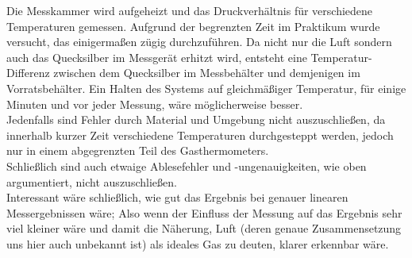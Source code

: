 \documentclass[12pt,a4paper]{article}
\begin{document}
\begin{multicols}{2}
Die Messkammer wird aufgeheizt und das Druckverhältnis für verschiedene Temperaturen gemessen. Aufgrund der begrenzten Zeit im Praktikum wurde versucht, das einigermaßen zügig durchzuführen. Da nicht nur die Luft sondern auch das Quecksilber im Messgerät erhitzt wird, entsteht eine Temperatur-Differenz zwischen dem Quecksilber im Messbehälter und demjenigen im Vorratsbehälter. Ein Halten des Systems auf gleichmäßiger Temperatur, für einige Minuten und vor jeder Messung, wäre möglicherweise besser.\\
Jedenfalls sind Fehler durch Material und Umgebung nicht auszuschließen, da innerhalb kurzer Zeit verschiedene Temperaturen durchgesteppt werden, jedoch nur in einem abgegrenzten Teil des Gasthermometers.\\
Schließlich sind auch etwaige Ablesefehler und -ungenauigkeiten, wie oben argumentiert, nicht auszuschließen.\\
Interessant wäre schließlich, wie gut das Ergebnis bei genauer linearen Messergebnissen wäre; Also wenn der Einfluss der Messung auf das Ergebnis sehr viel kleiner wäre und damit die Näherung, Luft (deren genaue Zusammensetzung uns hier auch unbekannt ist) als ideales Gas zu deuten, klarer erkennbar wäre.

\pagebreak


\end{multicols}
\end{document}
